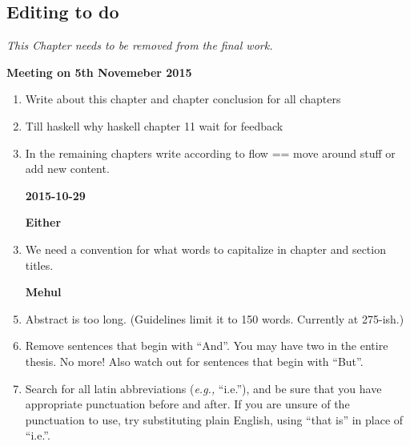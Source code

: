 
\begin{scope}
\nolinenumbers
\chapter{Editing to do}\label{chap:to-do}

\textit{\color{red} This Chapter needs to be removed from the final
  work.}

\textbf{Meeting on 5th Novemeber 2015} 
\begin{enumerate}
\item Write about this chapter and chapter conclusion for all chapters

\item Till haskell why haskell chapter 11 wait for feedback

\item In the remaining chapters write according to flow == move around stuff or add new content.
\end{enumerate}

\begin{enumerate}
\item [\textbf{2015-10-29}]
\item [\textbf{Either}]
\item
  We need a convention for what words to capitalize in chapter and
  section titles.

\item [\textbf{Mehul}]

\item
  Abstract is too long.  (Guidelines limit it to 150 words.  Currently
  at 275-ish.)

\item
  Remove sentences that begin with ``And''.
  You may have two in the entire thesis.
  No more!\label{item:no-and}
  Also watch out for sentences that begin with ``But''.

\item
  Search for all latin abbreviations (\textit{e.g.,} ``i.e.''), and be
  sure that you have appropriate punctuation before and after.
  If you are unsure of the punctuation to use, try substituting plain
  English,  using ``that is'' in place
  of ``i.e.''.


\end{enumerate}
\end{scope}
